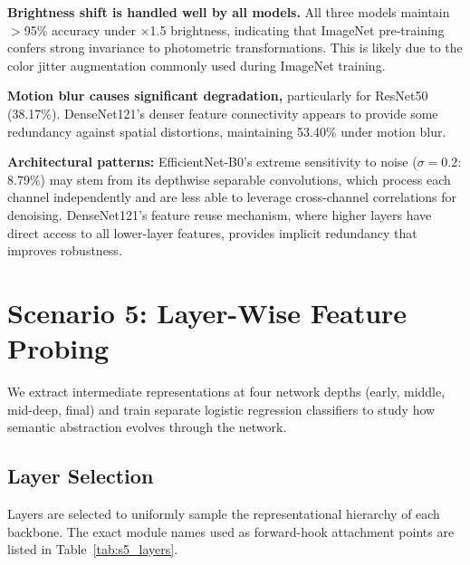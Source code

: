 \documentclass[11pt, a4paper]{article}
\begin{document}
\textbf{Brightness shift is handled well by all models.} All three models maintain $>$95\% accuracy under $\times$1.5 brightness, indicating that ImageNet pre-training confers strong invariance to photometric transformations. This is likely due to the color jitter augmentation commonly used during ImageNet training.

\textbf{Motion blur causes significant degradation,} particularly for ResNet50 (38.17\%). DenseNet121's denser feature connectivity appears to provide some redundancy against spatial distortions, maintaining 53.40\% under motion blur.

\textbf{Architectural patterns:} EfficientNet-B0's extreme sensitivity to noise ($\sigma=0.2$: 8.79\%) may stem from its depthwise separable convolutions, which process each channel independently and are less able to leverage cross-channel correlations for denoising. DenseNet121's feature reuse mechanism, where higher layers have direct access to all lower-layer features, provides implicit redundancy that improves robustness.


\section{Scenario 5: Layer-Wise Feature Probing}

We extract intermediate representations at four network depths (early, middle, mid-deep, final) and train separate logistic regression classifiers to study how semantic abstraction evolves through the network.

\subsection{Layer Selection}

Layers are selected to uniformly sample the representational hierarchy of each backbone. The exact module names used as forward-hook attachment points are listed in Table~\ref{tab:s5_layers}.
\end{document}
